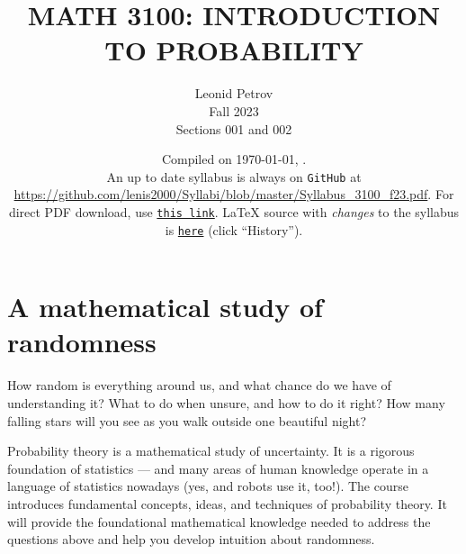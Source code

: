 \documentclass[oneside,11pt]{amsart}
\begin{document}
\title[MATH 3100: INTRODUCTION TO PROBABILITY]{MATH 3100: INTRODUCTION TO PROBABILITY}
\author{Leonid Petrov\\Fall 2023\\Sections 001 and 002}
\date{Compiled on \today, \currenttime.\\An up to date syllabus is always on \texttt{GitHub} at \url{https://github.com/lenis2000/Syllabi/blob/master/Syllabus_3100_f23.pdf}. For direct PDF download, use \href{https://github.com/lenis2000/Syllabi/raw/master/Syllabus_3100_f23.pdf}{\texttt{this link}}.
	\LaTeX{} source with \textit{changes} to the syllabus is \href{https://github.com/lenis2000/Syllabi/blob/master/Syllabus_3100_f23.tex}{\texttt{here}}
(click ``History'').}
\maketitle

\bigskip


\section{A mathematical study of randomness}

How random is everything around us, and what chance do we have of understanding it? What to do when unsure, and how to do it right? How many falling stars will you see as you walk outside one beautiful night? 

Probability theory is a mathematical study of uncertainty. It is a rigorous foundation of statistics --- and many areas of human knowledge operate in a language of statistics nowadays (yes, and robots use it, too!). The course introduces fundamental concepts, ideas, and techniques of probability theory. It will provide the foundational mathematical knowledge needed to address the questions above and help you develop intuition about randomness.
\end{document}
